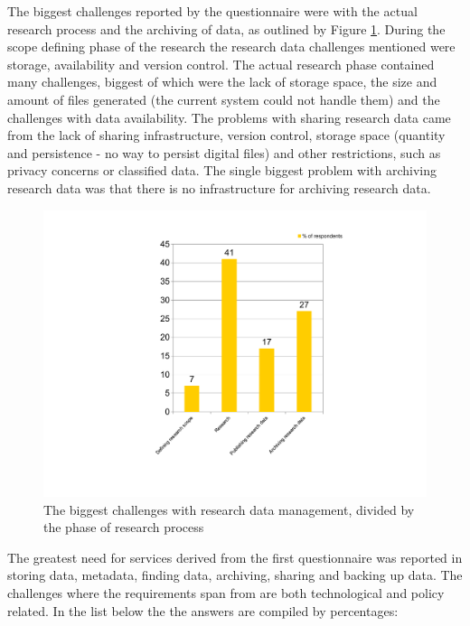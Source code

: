 The biggest challenges reported by the questionnaire were with the actual
research process and the archiving of data, as outlined by Figure
\ref{fig:challenges}. During the scope defining phase of the research the
research data challenges mentioned were storage, availability and version
control. The actual research phase contained many challenges, biggest of which
were the lack of storage space, the size and amount of files generated (the
current system could not handle them) and the challenges with data
availability. The problems with sharing research data came from the lack of
sharing infrastructure, version control, storage space (quantity and
persistence - no way to persist digital files) and other restrictions, such
as privacy concerns or classified data. The single biggest problem with
archiving research data was that there is no infrastructure for archiving
research data.

\begin{figure}
    \begin{centering}
        \includegraphics[width=\textwidth]{images/challenges}
    \end{centering}
    \caption{The biggest challenges with research data management, divided by the phase of research process}
    \label{fig:challenges}
\end{figure}

\pagebreak

The greatest need for services derived from the first questionnaire was
reported in storing data, metadata, finding data, archiving, sharing
and backing up data. The challenges where the requirements span from are both
technological and policy related. In the list below the the answers are
compiled by percentages:

